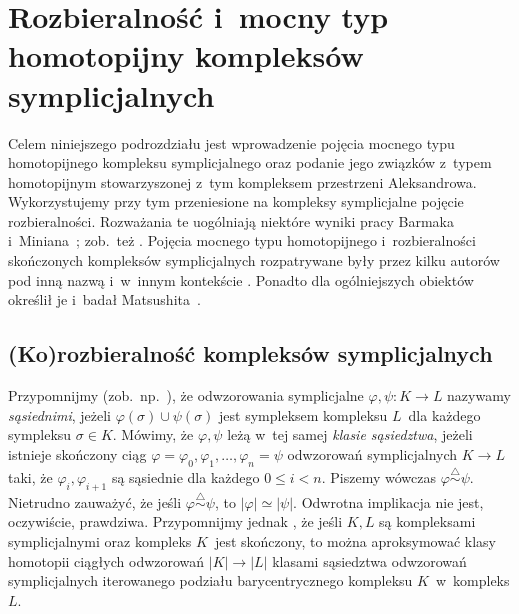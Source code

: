 
\section[Rozbieralność i~mocny typ homotopijny]{Rozbieralność i~mocny typ homotopijny kompleksów symplicjalnych}\label{sec-mocny_typ_homotopijny}%

Celem niniejszego podrozdziału jest wprowadzenie pojęcia mocnego typu homotopijnego kompleksu symplicjalnego oraz podanie jego związków z~typem homotopijnym stowarzyszonej z~tym kompleksem przestrzeni Aleksandrowa. Wykorzystujemy przy tym przeniesione na kompleksy symplicjalne pojęcie rozbieralności. Rozważania te uogólniają niektóre wyniki pracy Barmaka i~Miniana~\cite{Barmak12}; zob.~też \cite{Fieux12}. Pojęcia mocnego typu homotopijnego i~rozbieralności skończonych kompleksów symplicjalnych rozpatrywane były przez kilku autorów pod inną nazwą i~w~innym kontekście \cite{Civan07,Matousek08}. Ponadto dla ogólniejszych obiektów określił je i~badał Matsushita~\cite{Matsushita14}.

\subsection{(Ko)rozbieralność kompleksów symplicjalnych}
Przypomnijmy (zob.~np.~\cite{Spanier81}), że odwzorowania symplicjalne $\varphi,\psi\colon K\to L$ nazywamy \textit{sąsiednimi}, jeżeli $\varphi(\sigma)\cup\psi(\sigma)$ jest sympleksem kompleksu $L$~dla każdego sympleksu $\sigma\in K$. Mówimy, że $\varphi,\psi$ leżą w~tej samej \textit{klasie sąsiedztwa}, jeżeli istnieje skończony ciąg $\varphi=\varphi_0,\varphi_1,\ldots,\varphi_n=\psi$ odwzorowań symplicjalnych $K\to L$ taki, że $\varphi_i,\varphi_{i+1}$ są sąsiednie dla każdego $0\leq i<n$. Piszemy wówczas $\varphi\stackrel{\triangle}{\sim}\psi$. Nietrudno zauważyć, że jeśli $\varphi\stackrel{\triangle}{\sim}\psi$, to $|\varphi|\simeq |\psi|$. Odwrotna implikacja nie jest, oczywiście, prawdziwa. Przypomnijmy jednak \cite[Theorem 3.6.8]{Spanier81}, że jeśli $K,L$ są kompleksami symplicjalnymi oraz kompleks $K$~jest skończony, to można aproksymować klasy homotopii ciągłych odwzorowań $|K|\to |L|$ klasami sąsiedztwa odwzorowań symplicjalnych iterowanego podziału barycentrycznego kompleksu $K$~w~kompleks $L$.


